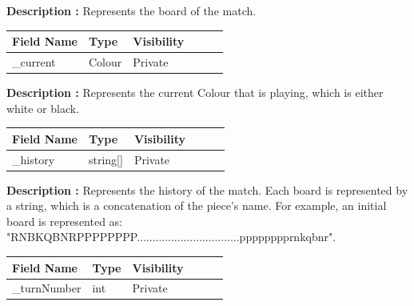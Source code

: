 \documentclass[12pt]{article}
\begin{document}
    \textbf{Description :}  Represents the board of the match.

    \begin{table}[H]
        \begin{tabular}{llllll}
            \hline
            \multicolumn{1}{|l|}{\cellcolor[HTML]{EFEFEF}\textbf{Field Name}} & \multicolumn{1}{l|}{\cellcolor[HTML]{EFEFEF}\textbf{Type}} & \multicolumn{1}{l|}{\cellcolor[HTML]{EFEFEF}\textbf{Visibility}} \\ \hline
            \multicolumn{1}{|l|}{\_current}                                   & \multicolumn{1}{l|}{Colour}                                & \multicolumn{1}{l|}{Private}                                     \\ \hline
        \end{tabular}
    \end{table}

    \textbf{Description :} Represents the current Colour that is playing, which is either white or black.

    \begin{table}[H]
        \begin{tabular}{llllll}
            \hline
            \multicolumn{1}{|l|}{\cellcolor[HTML]{EFEFEF}\textbf{Field Name}} & \multicolumn{1}{l|}{\cellcolor[HTML]{EFEFEF}\textbf{Type}} & \multicolumn{1}{l|}{\cellcolor[HTML]{EFEFEF}\textbf{Visibility}} \\ \hline
            \multicolumn{1}{|l|}{\_history}                                   & \multicolumn{1}{l|}{string[]}                              & \multicolumn{1}{l|}{Private}                                     \\ \hline
        \end{tabular}
    \end{table}

    \textbf{Description :} Represents the history of the match.
    Each board is represented by a string, which is a concatenation of the piece's name.
    For example, an initial board is represented as:
    \\"RNBKQBNRPPPPPPPP.................................pppppppprnkqbnr".

    \begin{table}[H]
        \begin{tabular}{llllll}
            \hline
            \multicolumn{1}{|l|}{\cellcolor[HTML]{EFEFEF}\textbf{Field Name}} & \multicolumn{1}{l|}{\cellcolor[HTML]{EFEFEF}\textbf{Type}} & \multicolumn{1}{l|}{\cellcolor[HTML]{EFEFEF}\textbf{Visibility}} \\ \hline
            \multicolumn{1}{|l|}{\_turnNumber}                                & \multicolumn{1}{l|}{int}                                   & \multicolumn{1}{l|}{Private}                                     \\ \hline
        \end{tabular}
    \end{table}
\end{document}
